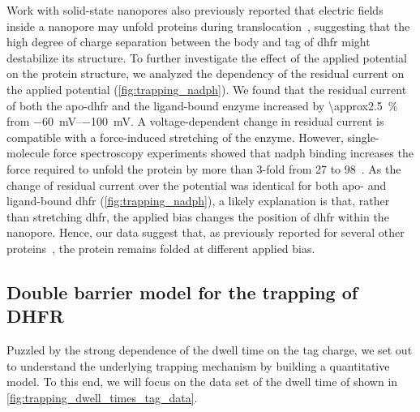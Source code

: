 Work with solid-state nanopores also previously reported that electric fields inside a nanopore may unfold
proteins during translocation~\cite{Talaga-2009}, suggesting that the high degree of charge separation between
the body and tag of \gls{dhfr} might destabilize its structure. To further investigate the effect of the
applied potential on the protein structure, we analyzed the dependency of the residual current on the applied
potential (\cref{fig:trapping_nadph}). We found that the residual current of both the apo-\gls{dhfr} and the
ligand-bound enzyme increased by \SI{\approx2.5}{\percent} from \SIrange{-60}{-100}{\mV}. A voltage-dependent
change in residual current is compatible with a force-induced stretching of the enzyme. However,
single-molecule force spectroscopy experiments showed that \gls{nadph} binding increases the force required to
unfold the protein by more than 3-fold from \num{27} to \SI{98}{\pN}~\cite{Ainavarapu-2005}. As the change of
residual current over the potential was identical for both apo- and ligand-bound \gls{dhfr}
(\cref{fig:trapping_nadph}), a likely explanation is that, rather than stretching \gls{dhfr}, the applied bias
changes the position of \gls{dhfr} within the nanopore. Hence, our data suggest that, as previously reported
for several other proteins~\cite{VanMeervelt-2017,Galenkamp-2018}, the protein remains folded at different
applied bias.


\subsection{Double barrier model for the trapping of {DHFR}}

Puzzled by the strong dependence of the dwell time on the tag charge, we set out to understand the underlying
trapping mechanism by building a quantitative model. To this end, we will focus on the data set of the dwell
time of  shown in \cref{fig:trapping_dwell_times_tag_data}.


